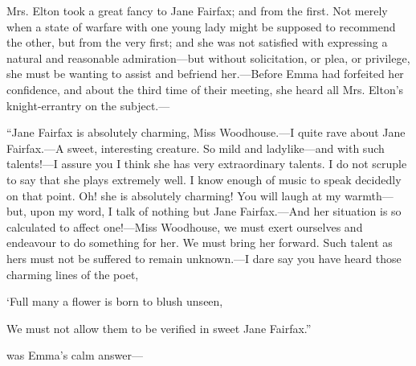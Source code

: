 Mrs. Elton took a great fancy to Jane Fairfax; and from the first. Not merely when a state of warfare with one young lady might be supposed to recommend the other, but from the very first; and she was not satisfied with expressing a natural and reasonable admiration---but without solicitation, or plea, or privilege, she must be wanting to assist and befriend her.---Before Emma had forfeited her confidence, and about the third time of their meeting, she heard all Mrs. Elton's knight-errantry on the subject.---

“Jane Fairfax is absolutely charming, Miss Woodhouse.---I quite rave about Jane Fairfax.---A sweet, interesting creature. So mild and ladylike---and with such talents!---I assure you I think she has very extraordinary talents. I do not scruple to say that she plays extremely well. I know enough of music to speak decidedly on that point. Oh! she is absolutely charming! You will laugh at my warmth---but, upon my word, I talk of nothing but Jane Fairfax.---And her situation is so calculated to affect one!---Miss Woodhouse, we must exert ourselves and endeavour to do something for her. We must bring her forward. Such talent as hers must not be suffered to remain unknown.---I dare say you have heard those charming lines of the poet,

‘Full many a flower is born to blush unseen,\crlf
{}

We must not allow them to be verified in sweet Jane Fairfax.”

 was Emma's calm answer---


